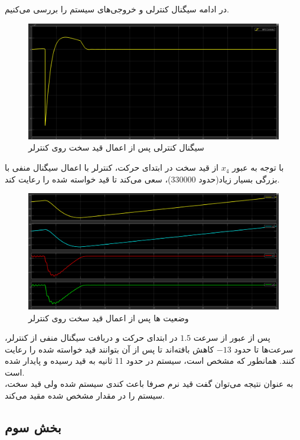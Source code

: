 \documentclass[14pt, a4paper]{extarticle}
\begin{document}
در ادامه سیگنال کنترلی و خروجی‌های سیستم را بررسی می‌کنیم.
\newpage

\begin{figure}[h!]
	\centering
	\includegraphics[scale = 0.3]{Q2_2_2_control.png}
	\caption{سیگنال کنترلی پس از اعمال قید سخت روی کنترلر}
\end{figure}

با توجه به عبور 
$x_4$
از قید سخت در ابتدای حرکت، کنترلر با اعمال سیگنال منفی با بزرگی بسیار زیاد(حدود 330000)، سعی می‌کند تا قید خواسته شده را رعایت کند.
\begin{figure}[h!]
	\centering
	\includegraphics[scale = 0.3]{Q2_2_2_states.png}
	\caption{وضعیت 
		ها پس از اعمال قید سخت روی کنترلر}
\end{figure}

پس از عبور از سرعت
$1.5$
 در ابتدای حرکت و دربافت سیگنال منفی از کنترلر، سرعت‌ها تا حدود 
$-13$
کاهش بافته‌اند تا پس از آن بتوانند قید خواسته شده را رعایت کنند. همانطور که مشخص است،‌ سیستم در حدود 11 ثانیه به قید رسیده و پایدار شده است.\\
به عنوان نتیجه می‌توان گفت قید نرم صرفا باعث کندی سیستم شده ولی قید سخت، سیستم را در مقدار مشخص شده مقید می‌کند.

\newpage
\subsection{بخش سوم}
\end{document}
